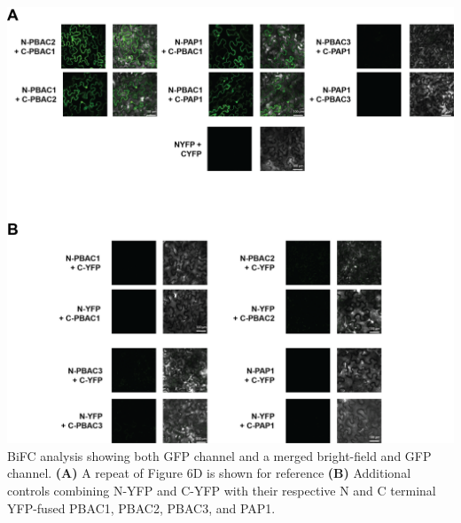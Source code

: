 \clearpage
\begin{FPfigure}
	\centering
	\includegraphics[width=\columnwidth]{Proteasome/bifccontrols.png}
	{BiFC analysis showing both GFP channel and a merged bright-field and GFP channel. \textbf{(A)} A repeat of Figure 6D is shown for reference \textbf{(B)} Additional controls combining N-YFP and C-YFP with their respective N and C terminal YFP-fused PBAC1, PBAC2, PBAC3, and PAP1.}
	\label{fig:bifccontrol}
\end{FPfigure}

